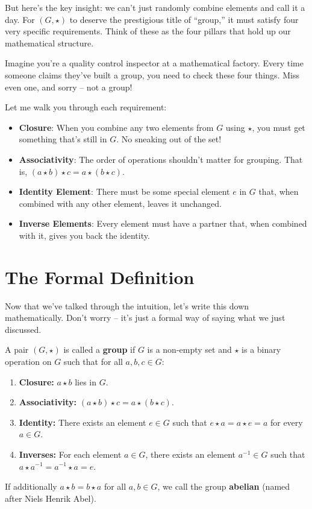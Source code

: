 \documentclass[12pt]{article}
\begin{document}
But here's the key insight: we can't just randomly combine elements and call it a day. For $(G,\star)$ to deserve the prestigious title of ``group,'' it must satisfy four very specific requirements. Think of these as the four pillars that hold up our mathematical structure.

Imagine you're a quality control inspector at a mathematical factory. Every time someone claims they've built a group, you need to check these four things. Miss even one, and sorry – not a group!

Let me walk you through each requirement:

\begin{itemize}
\item \textbf{\textcolor{KeyTermColor}{Closure}}: When you combine any two elements from $G$ using $\star$, you must get something that's still in $G$. No sneaking out of the set!
\item \textbf{\textcolor{KeyTermColor}{Associativity}}: The order of operations shouldn't matter for grouping. That is, $(a\star b)\star c = a\star(b\star c)$.
\item \textbf{\textcolor{KeyTermColor}{Identity Element}}: There must be some special element $e$ in $G$ that, when combined with any other element, leaves it unchanged.
\item \textbf{\textcolor{KeyTermColor}{Inverse Elements}}: Every element must have a partner that, when combined with it, gives you back the identity.
\end{itemize}

\section{\textcolor{SectionColor}{The Formal Definition}}

Now that we've talked through the intuition, let's write this down mathematically. Don't worry – it's just a formal way of saying what we just discussed.

\begin{definitionbox}
A pair $(G,\star)$ is called a \textbf{group} if $G$ is a non-empty set and $\star$ is a binary operation on $G$ such that for all $a,b,c\in G$:

\begin{enumerate}
  \item \textbf{Closure:} $a\star b$ lies in $G$.
  \item \textbf{Associativity:} $(a\star b)\star c = a\star(b\star c)$.
  \item \textbf{Identity:} There exists an element $e\in G$ such that $e\star a=a\star e=a$ for every $a\in G$.
  \item \textbf{Inverses:} For each element $a\in G$, there exists an element $a^{-1}\in G$ such that $a\star a^{-1}=a^{-1}\star a=e$.
\end{enumerate}

If additionally $a\star b=b\star a$ for all $a,b\in G$, we call the group \textcolor{AbelianColor}{\textbf{abelian}} (named after Niels Henrik Abel).
\end{definitionbox}
\end{document}
